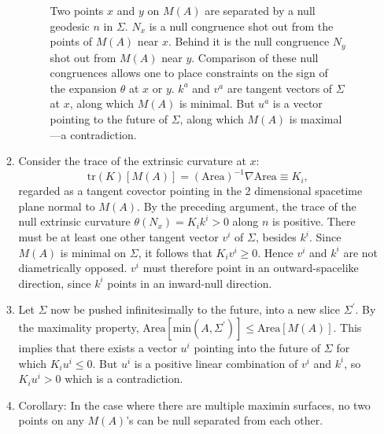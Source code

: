 \documentclass[12pt]{article}
\begin{document}
\begin{enumerate}[resume]
\begin{enumerate}
\begin{figure}[hbt]
\caption{\footnotesize Two points $x$ and $y$ on $M(A)$ are separated by a null geodesic $n$ in $\Sigma$.  $N_x$ is a null congruence shot out from the points of $M(A)$ near $x$.  Behind it is the null congruence $N_y$ shot out from $M(A)$ near $y$.  Comparison of these null congruences allows one to place constraints on the sign of the expansion $\theta$ at $x$ or $y$.  $k^a$ and $v^a$ are tangent vectors of $\Sigma$ at $x$, along which $M(A)$ is minimal.  But $u^a$ is a vector pointing to the future of $\Sigma$, along which $M(A)$ is maximal---a contradiction.}\label{nulls}
\end{figure}
	\item  Consider the trace of the extrinsic curvature at $x$:
\begin{equation}\label{Ki}
\mathrm{tr}(K)[M(A)] = (\mathrm{Area})^{-1} \nabla \mathrm{Area} \equiv K_i,
\end{equation}
regarded as a tangent covector pointing in the 2 dimensional spacetime plane normal to $M(A)$.  By the preceding argument, the trace of the null extrinsic curvature $\theta(N_x) = K_i k^i > 0$ along $n$ is positive.  There must be at least one other tangent vector $v^i$ of $\Sigma$, besides $k^i$.  Since $M(A)$ is minimal on $\Sigma$, it follows that $K_i v^i \ge 0$.  Hence $v^i$ and $k^i$ are not diametrically opposed.  $v^i$ must therefore point in an outward-spacelike direction, since $k^i$ points in an inward-null direction.
	\item Let $\Sigma$ now be pushed infinitesimally to the future, into a new slice $\Sigma^\prime$.  By the maximality property, $\mathrm{Area}[\mathrm{min}(A,\Sigma^\prime)] \le \mathrm{Area}[M(A)]$.  This implies that there exists a vector $u^i$ pointing into the future of $\Sigma$ for which $K_i u^i \le 0$.  But $u^i$ is a positive linear combination of $v^i$ and $k^i$, so $K_i u^i > 0$ which is a contradiction.  
	\item Corollary: In the case where there are multiple maximin surfaces, no two points on any $M(A)$'s can be null separated from each other.
	\end{enumerate}


\end{enumerate}
\end{document}
